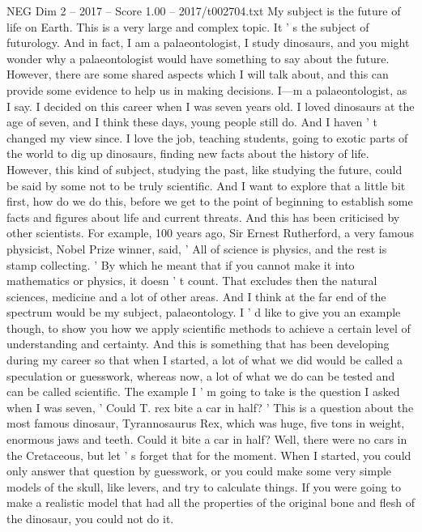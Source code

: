 \begin{textsample}{NEG Dim 2 – 2017 – Score 1.00 – 2017/t002704.txt}  \label{ex:f2_neg_050}
My subject is the future of life on Earth.
This is a very large and complex topic.
It ' s the subject of futurology.
And in fact, I am a palaeontologist, I study dinosaurs, and you might wonder why a palaeontologist would have something to say about the future.
However, there are some shared aspects which I will talk about, and this can provide some evidence to help us in making decisions.
I—m a palaeontologist, as I say.
I decided on this career when I was seven years old.
I loved dinosaurs at the age of seven, and I think these days, young people still do.
And I haven ' t changed my view since.
I love the job, teaching students, going to exotic parts of the world to dig up dinosaurs, finding new facts about the history of life.
However, this kind of subject, studying the past, like studying the future, could be said by some not to be truly scientific.
And I want to explore that a little bit first, how do we do this, before we get to the point of beginning to establish some facts and figures about life and current threats.
And this has been criticised by other scientists.
For example, 100 years ago, Sir Ernest Rutherford, a very famous physicist, Nobel Prize winner, said, ' All of science is physics, and the rest is stamp collecting. ' By which he meant that if you cannot make it into mathematics or physics, it doesn ' t count.
That excludes then the natural sciences, medicine and a lot of other areas.
And I think at the far end of the spectrum would be my subject, palaeontology.
I ' d like to give you an example though, to show you how we apply scientific methods to achieve a certain level of understanding and certainty.
And this is something that has been developing during my career so that when I started, a lot of what we did would be called a speculation or guesswork, whereas now, a lot of what we do can be tested and can be called scientific.
The example I ' m going to take is the question I asked when I was seven, ' Could T. rex bite a car in half? ' This is a question about the most famous dinosaur, Tyrannosaurus Rex, which was huge, five tons in weight, enormous jaws and teeth.
Could it bite a car in half?
Well, there were no cars in the Cretaceous, but let ' s forget that for the moment.
When I started, you could only answer that question by guesswork, or you could make some very simple models of the skull, like levers, and try to calculate things.
If you were going to make a realistic model that had all the properties of the original bone and flesh of the dinosaur, you could not do it.

\end{textsample}
